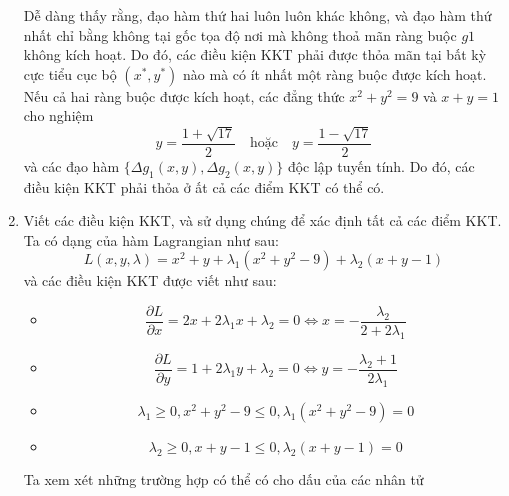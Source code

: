 \begin{solution}
\begin{enumerate}[label=(\alph*)]
        Dễ dàng thấy rằng, đạo hàm thứ hai luôn luôn khác không, và đạo hàm thứ nhất chỉ bằng không tại gốc tọa độ nơi mà không thoả mãn ràng buộc $g1$ không kích hoạt. Do đó, các điều kiện KKT phải được thỏa mãn tại bất kỳ cực tiểu cục bộ $(x^{*}, y^{*})$ nào mà có ít nhất một ràng buộc được kích hoạt. Nếu cả hai ràng buộc được kích hoạt, các đẳng thức $x^{2} + y^{2} = 9$ và $x + y = 1$ cho nghiệm 
        \begin{equation}
            y = \dfrac{1+\sqrt{17}}{2}\quad\text{hoặc}\quad y = \dfrac{1-\sqrt{17}}{2}
        \end{equation}
        và các đạo hàm $\{\Delta g_1(x, y), \Delta g_2(x, y) \}$ độc lập tuyến tính. Do đó, các điều kiện KKT phải thỏa ở ất cả các điểm KKT có thể có.
        \item Viết các điều kiện KKT, và sử dụng chúng để xác định tất cả các điểm KKT. Ta có dạng của hàm Lagrangian như sau:
        \begin{equation}
            L(x,y,\lambda) = x^2 + y + \lambda_1(x^2 + y^2 - 9) + \lambda_2(x + y  - 1)
        \end{equation}
        và các điều kiện KKT được viết như sau:
        \begin{itemize}
            \item \begin{equation}
                \dfrac{\partial L}{\partial x} = 2x + 2\lambda_1x + \lambda_2 = 0 \Leftrightarrow x = -\dfrac{\lambda_2}{2+2\lambda_1}
            \end{equation}
            \item \begin{equation}
                \dfrac{\partial L}{\partial y} = 1 + 2\lambda_1y + \lambda_2 = 0 \Leftrightarrow y = -\dfrac{\lambda_2 + 1}{2\lambda_1}
            \end{equation}
            \item \begin{equation}
                \lambda_1 \geq 0, x^2 + y^2 - 9 \leq 0, \lambda_1(x^2 + y^2 - 9) = 0
            \end{equation}
            \item \begin{equation}
                \lambda_2 \geq 0, x + y  - 1 \leq 0, \lambda_2(x + y  - 1) = 0
            \end{equation}
        \end{itemize}
        Ta xem xét những trường hợp có thể có cho dấu của các nhân tử
        \begin{itemize}

\end{itemize}
\end{enumerate}
\end{solution}
